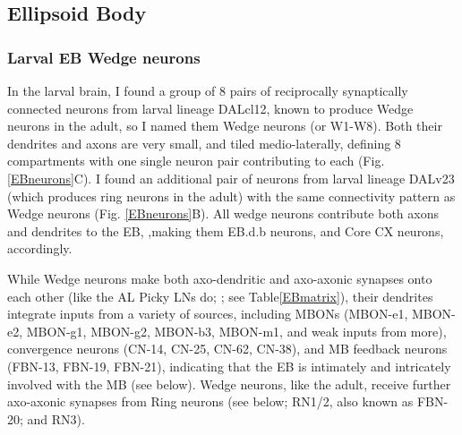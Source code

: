 \begin{table} [h!]
{        }
        \caption[PB Horizontal Fibres connection to  PB Columnar ]{\textbf{PB horizontal fibres (HF-PB) connectivity to  PB columnar neurons} A connectivity matrix representing connections from HF-PB neurons (rows) to PB columnar neurons (columns) is shown. Only the the two pairs of HF-PB1 (written here as HF-PB1\_1 and HF-PB1\_2) which send connections to PB columnar are presented. Neuron pairs are split in left (\_l) and right (\_r) cells for a more comprehensive understanding of the strength of connections.  The left neuron from pair MB2ON-241 (5th column) has missing synapses because these haven't been traced yet, however these are considered present given reliability of the right one.}
        \label{PBconnections}
        \end{table}



    \subsection{Ellipsoid Body}
         \subsubsection{Larval EB Wedge neurons}
    In the larval brain, I found a group of 8 pairs of reciprocally synaptically connected neurons from larval lineage DALcl12, known to produce Wedge neurons in the adult, so I named them Wedge neurons (or W1-W8).
    Both their dendrites and axons are very small, and tiled medio-laterally, defining 8 compartments with one single neuron pair contributing to each (Fig. \ref{EBneurons}C).
    I found an additional pair of neurons from larval lineage DALv23 (which produces ring neurons in the adult) with the same connectivity pattern as Wedge neurons (Fig. \ref{EBneurons}B). All wedge neurons contribute both axons and dendrites to the EB, ,making them EB.d.b neurons, and Core CX neurons, accordingly.

    While Wedge neurons make both axo-dendritic and axo-axonic synapses onto each other (like the AL Picky LNs do; \citep{berck2016wiring}; see Table\ref{EBmatrix}), their dendrites integrate inputs from a variety of sources, including MBONs (MBON-e1, MBON-e2, MBON-g1, MBON-g2, MBON-b3, MBON-m1, and weak inputs from more), convergence neurons (CN-14, CN-25, CN-62, CN-38), and MB feedback neurons (FBN-13, FBN-19, FBN-21), indicating that the EB is intimately and intricately involved with the MB (see below).
    Wedge neurons, like the adult, receive further axo-axonic synapses from Ring neurons (see below; RN1/2, also known as FBN-20; and RN3).
      
